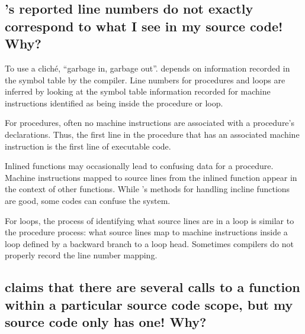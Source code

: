 \documentclass[11pt,twoside,letterpaper]{report}
\begin{document}

\subsection{\hpcviewer{}'s reported line numbers do not exactly correspond to what I see in my source code!  Why?}

To use a clich\'{e}, ``garbage in, garbage out''.
\HPCToolkit{} depends on information recorded in the symbol table by the compiler.
Line numbers for procedures and loops are inferred by looking at the symbol table information recorded for machine instructions identified as being inside the procedure or loop.

For procedures, often no machine instructions are associated with a procedure's declarations.
Thus, the first line in the procedure that has an associated machine instruction is the first line of executable code.

Inlined functions may occasionally lead to confusing data for a procedure.
Machine instructions mapped to source lines from the inlined function appear in the context of other functions.
While \hpcprof{}'s methods for handling incline functions are good, some codes can confuse the system.

For loops, the process of identifying what source lines are in a loop is similar to the procedure process: what source lines map to machine instructions inside a loop defined by a backward branch to a loop head.
Sometimes compilers do not properly record the line number mapping.




\subsection{\hpcviewer{} claims that there are several calls to a function within a particular source code scope, but my source code only has one!  Why?}
\end{document}
